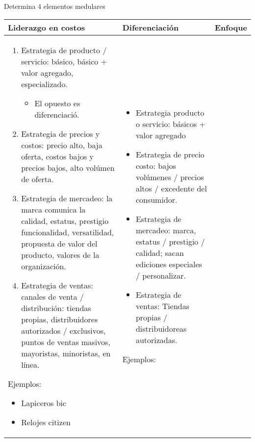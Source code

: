 Determina 4 elementos medulares
\begin{center}
    \begin{tabular}{ | p{5.8cm} | p{5.8cm} | p{5.8cm} |}
        \hline
            Liderazgo en costos & 
            Diferenciación &
            Enfoque
                \\
        \hline
        \begin{enumerate}
            \item Estrategia de producto / servicio: básico, básico + valor agregado, especializado.
                \begin{itemize}
                    \item El opuesto es diferenciació.
                \end{itemize}
            \item Estrategia de precios y costos: precio alto, baja oferta, costos bajos y precios bajos, alto volúmen de oferta.
            \item Estrategia de mercadeo: la marca comunica la calidad, estatus, prestigio funcionalidad, versatilidad, propuesta de valor del producto, valores de la organización.
            \item Estrategia de ventas: canales de venta / distribución: tiendas propias, distribuidores autorizados / exclusivos, puntos de ventas masivos, mayoristas, minoristas, en línea.
        \end{enumerate}
        Ejemplos:
            \begin{itemize}
                \item Lapiceros bic 
                \item Relojes citizen
            \end{itemize}
        & 
        \begin{itemize}
            \item Estrategia producto o servicio: básicos +  valor agregado
            \item Estrategia de precio costo: bajos volúmenes / precios altos / excedente del consumidor.
            \item Estrategia de mercadeo: marca, estatus / prestigio / calidad; sacan ediciones especiales / personalizar.
            \item Estrategia de ventas: Tiendas propias / distribuidoreas autorizadas. 
        \end{itemize} 
        Ejemplos: 
            \begin{itemize}

\end{itemize}
\end{tabular}
\end{center}
